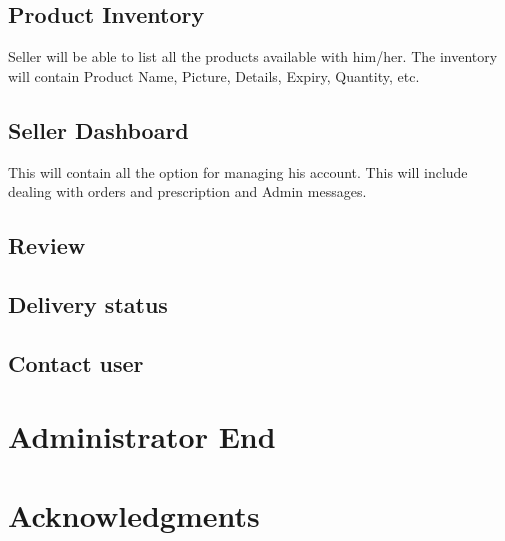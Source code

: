 \documentclass[fleqn,10pt]{../SelfArx} %
\begin{document}
\subsection{Product Inventory}

Seller will be able to list all the products available with him/her. The inventory will contain Product Name, Picture, Details, Expiry, Quantity, etc.
\subsection{Seller Dashboard}

This will contain all the option for managing his account. This will include dealing with orders and prescription and Admin messages.
\subsection{Review}

\subsection{Delivery status}

\subsection{Contact user}

\section{Administrator End}

\section*{Acknowledgments} %


%
%

\end{document}
